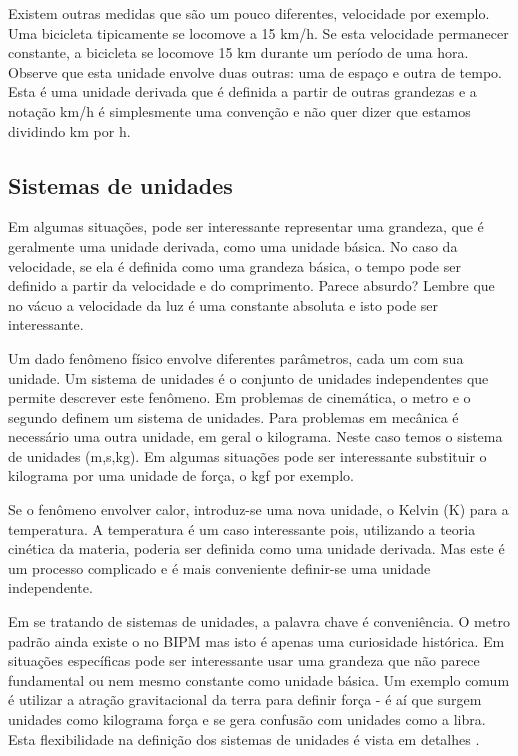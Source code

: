 \documentclass[article,12pt,oneside,a4paper,english,brazil,sumario=tradicional]{abntex2}
\begin{document}
Existem outras medidas que são um pouco diferentes, velocidade por exemplo. Uma bicicleta tipicamente se locomove a 15 km/h. Se esta velocidade permanecer constante, a bicicleta se locomove 15 km durante um período de uma hora. Observe que esta unidade envolve duas outras: uma de espaço e outra de tempo. Esta é uma unidade derivada que é definida a partir de outras grandezas e a notação km/h é simplesmente uma convenção e não quer dizer que estamos dividindo km por h.

\subsection{Sistemas de unidades}

Em algumas situações, pode ser interessante representar uma grandeza, que é geralmente uma unidade derivada, como uma unidade básica. No caso da velocidade, se ela é definida como uma grandeza básica, o tempo pode ser definido a partir da velocidade e do comprimento. Parece absurdo? Lembre que no vácuo a velocidade da luz é uma constante absoluta e isto pode ser interessante.

Um dado fenômeno físico envolve diferentes parâmetros, cada um com sua unidade. Um sistema de unidades é o conjunto de unidades independentes que permite descrever este fenômeno. Em problemas de cinemática, o metro e o segundo definem um sistema de unidades. Para problemas em mecânica é necessário uma outra unidade, em geral o kilograma. Neste caso temos o sistema de unidades (m,s,kg). Em algumas situações pode ser interessante substituir o kilograma por uma unidade de força, o kgf por exemplo.

Se o fenômeno envolver calor, introduz-se uma nova unidade, o Kelvin (K) para a temperatura. A temperatura é um caso interessante pois, utilizando a teoria cinética da materia, poderia ser definida como uma unidade derivada. Mas este é um processo complicado e é mais conveniente definir-se uma unidade independente.

Em se tratando de sistemas de unidades, a palavra chave é conveniência. O metro padrão ainda existe o no BIPM mas isto é apenas uma curiosidade histórica. Em situações específicas pode ser interessante usar uma grandeza que não parece fundamental ou nem mesmo constante como unidade básica. Um exemplo comum é utilizar a atração gravitacional da terra para definir força - é aí que surgem unidades como kilograma força e se gera confusão com unidades como a libra. Esta flexibilidade na definição dos sistemas de unidades é vista em detalhes .
\end{document}
